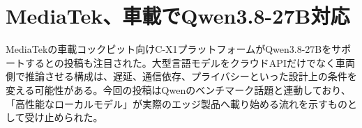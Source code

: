 \section{MediaTek、車載でQwen3.8-27B対応}
MediaTekの車載コックピット向けC-X1プラットフォームがQwen3.8-27Bをサポートするとの投稿も注目された。大型言語モデルをクラウドAPIだけでなく車両側で推論させる構成は、遅延、通信依存、プライバシーといった設計上の条件を変える可能性がある。今回の投稿はQwenのベンチマーク話題と連動しており、「高性能なローカルモデル」が実際のエッジ製品へ載り始める流れを示すものとして受け止められた。
